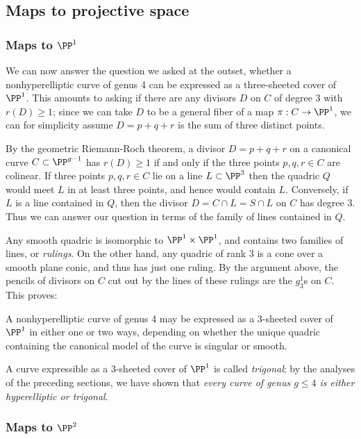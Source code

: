 \subsection{Maps to projective space}

\subsubsection{Maps to $\PP^1$}

We can now answer the question we asked at the outset, whether a nonhyperelliptic curve of genus 4 can be expressed as a three-sheeted cover of $\PP^1$. This amounts to asking if there are any divisors $D$ on $C$ of degree 3 with $r(D) \geq 1$; since we can take $D$ to be a general fiber of a map $\pi : C \to \PP^1$, we can for simplicity assume $D = p+q+r$ is the sum of three distinct points.

By the geometric Riemann-Roch theorem, a divisor $D = p+q+r$ on a canonical curve $C \subset \PP^{g-1}$ has $r(D) \geq 1$ if and only if the three points $p,q,r \in C$ are colinear. If three points $p,q,r \in C$ lie on a line $L \subset \PP^3$ then the quadric $Q$ would meet $L$ in at least three points, and hence would contain $L$. Conversely,  if $L$ is a line contained in $Q$, then the divisor $D = C \cap L = S \cap L$ on $C$ has degree  3. Thus we can answer our question in terms of the family of lines contained in $Q$.

Any smooth quadric is isomorphic to $\PP^1\times \PP^1$, and contains two families of lines, or \emph{rulings}. On the other hand, any  quadric of rank 3 is a cone over a smooth plane conic, and thus has just one ruling. By the argument above, the pencils of divisors on $C$ cut out by the lines of these rulings are the $g^1_3$s on $C$. This proves:

\begin{proposition}\label{genus 4 trigonal}
A nonhyperelliptic curve of genus 4 may be expressed as a 3-sheeted cover of $\PP^1$ in either one or two ways, depending on whether the unique quadric containing the canonical model of the curve is singular or smooth.
\end{proposition}

A curve expressible as a 3-sheeted cover of $\PP^1$ is called \emph{trigonal}; by the analyses of the preceding sections, we have shown that \emph{every curve of genus $g \leq 4$ is either hyperelliptic or trigonal}. 

\subsubsection{Maps to $\PP^2$}

